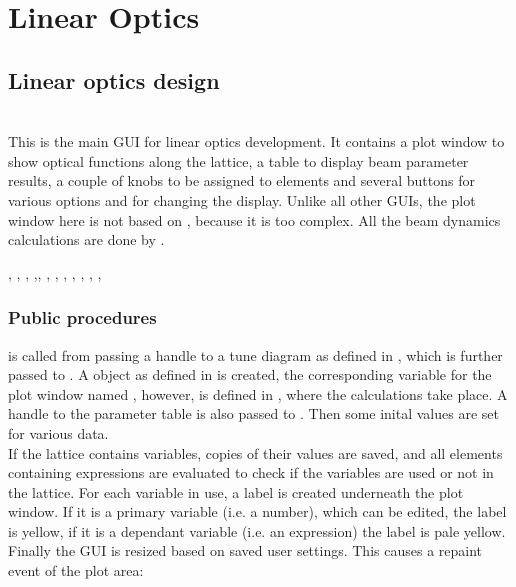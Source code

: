 \documentclass[12pt]{article}
\newcommand\code[1]{{\tt #1}}
\newcommand\guico[1]{{\color{blue}\code{#1}}}
\newcommand{\unico}[1]{{\color{burntorange}\code{#1}}}
\newcommand{\opagui}[1]{\colorbox{blue!20}{{\color{black}\code{#1}}}}
\newcommand{\oguih}[2]{\subsection{\label{#2}#1}{\Huge\opagui{#2}}\\}
\newcommand{\ogui}[1]{\hyperref[#1]{\opagui{#1}}}
\newcommand{\opaguif}[1]{\colorbox{violet!30}{{\color{black}\code{#1}}}}
\newcommand{\oguif}[1]{\hyperref[#1]{\opaguif{#1}}}
\newcommand{\opauni}[1]{\colorbox{orange!30}{{\color{black}\code{#1}}}}
\newcommand{\ouni}[1]{\hyperref[#1]{\opauni{#1}}}
\newcommand{\uses}[1]{\flushleft {\bf Uses:} #1}
\newcommand{\desc}[1]{#1}
\newcommand{\ppro}[1]{\subsubsection*{Public procedures} #1}
\begin{document}
\section{\label{seclino}Linear Optics}

\oguih{Linear optics design}{opalinop} 

\desc{This is the main GUI for linear optics development. It contains a plot window to show optical functions along the lattice, a table to display beam parameter results, a couple of knobs to be assigned to elements and several buttons for various options and for changing the display. Unlike all other GUIs, the plot window here is not based on \oguif{../com/asfigure}, because it is too complex. All the beam dynamics calculations are done by \ouni{linoplib}.}

\uses{\oguif{knobframe}, \ogui{ostartmenu}, \ogui{otunematrix}, \ogui{owriteomrk},\ogui{obetenvmag}, \ogui{omatching}, \ouni{linoplib}, \ogui{opatunediag}, \ogui{oeleedit}, \ouni{globlib}, \ouni{mathlib}, \ouni{../com/vgraph}, \ouni{../com/asaux}} 

\ppro{
\guico{Init} is called from \ogui{opamenu} passing a handle to a tune diagram as defined in \ogui{opatunediag}, which is further passed to \ouni{linoplib}. A \unico{Vplot} object as defined in \ouni{../com/vgraph} is created, the corresponding variable for the plot window named \unico{vp}, however, is defined in \ouni{linoplib}, where the calculations take place. A handle to the parameter table \guico{tab} is also passed to \ouni{linoplib}. Then some inital values are set for various data.\\
If the lattice contains variables, copies of their values are saved, and all elements containing expressions are evaluated to check if the variables are used or not in the lattice. For each variable in use, a label is created underneath the plot window. If it is a primary variable (i.e. a number), which can be edited, the label is yellow, if it is a dependant variable (i.e. an expression) the label is pale yellow.\\
Finally the GUI is resized based on saved user settings. This causes a repaint event of the plot area:
}
\end{document}

